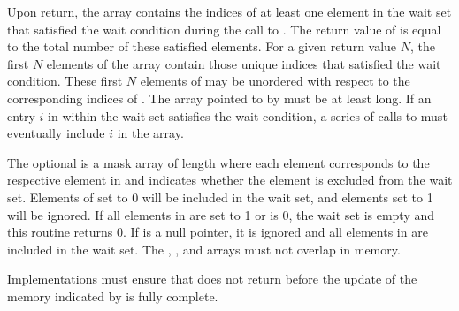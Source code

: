 \begin{apidefinition}
{    Upon return, the  array contains the indices of at least one
    element in the wait set that satisfied the wait condition during the call
    to .  The return value of
     is equal to the total
    number of these satisfied elements.  For a given return value $N$, the
    first $N$ elements of the  array contain those unique indices
    that satisfied the wait condition.  These first $N$ elements of
     may be unordered with respect to the corresponding indices of
    .  The array pointed to by  must be at least
     long.  If an entry $i$ in  within the wait set
    satisfies the wait condition, a series of calls to
     must eventually include
    $i$ in the  array.

    The optional  is a mask array of length  where each
    element corresponds to the respective element in  and indicates
    whether the element is excluded from the wait set.  Elements of
     set to 0 will be included in the wait set, and elements set to
    1 will be ignored.  If all elements in  are set to 1 or
     is 0, the wait set is empty and this routine returns 0.
    If  is a null pointer, it is ignored
    and all elements in  are included in the wait set.  The
    , , and  arrays must not overlap in
    memory.

    Implementations must ensure that 
    does not return before the update of the memory indicated by  is
    fully complete.
}





\end{apidefinition}
